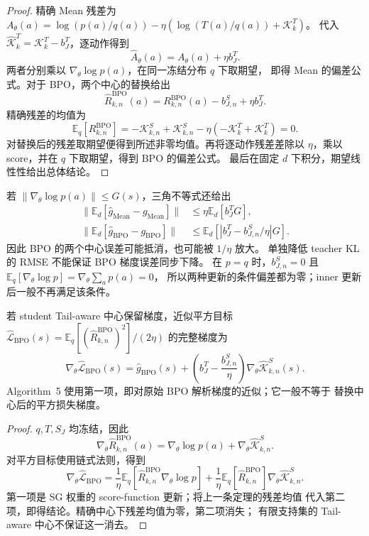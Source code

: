 \begin{proof}
精确 Mean 残差为
$A_\theta(a)=\log(p(a)/q(a))-\eta(\log(T(a)/q(a))+\mathcal K_k^T)$。
代入 $\widehat{\mathcal K}_k^T=\mathcal K_k^T-b_J^T$，逐动作得到
\[
 \widehat A_\theta(a)=A_\theta(a)+\eta b_J^T.
\]
两者分别乘以 $\nabla_\theta\log p(a)$，在同一冻结分布 $q$ 下取期望，
即得 Mean 的偏差公式。对于 BPO，两个中心的替换给出
\[
 \widehat R_{k,n}^{\mathrm{BPO}}(a)=R_{k,n}^{\mathrm{BPO}}(a)-b_{J,n}^S+\eta b_J^T.
\]
精确残差的均值为
\[
 \mathbb E_q[R_{k,n}^{\mathrm{BPO}}]
 =-\mathcal K_{k,n}^S+\mathcal K_{k,n}^S
 -\eta(-\mathcal K_k^T+\mathcal K_k^T)=0.
\]
对替换后的残差取期望便得到所述非零均值。再将逐动作残差差除以
$\eta$，乘以 score，并在 $q$ 下取期望，得到 BPO 的偏差公式。
最后在固定 $d$ 下积分，期望线性性给出总体结论。
\end{proof}

若 $\lVert\nabla_\theta\log p(a)\rVert\le G(s)$，三角不等式还给出
\begin{align}
 \lVert\mathbb E_d[\widehat g_{\mathrm{Mean}}-g_{\mathrm{Mean}}]\rVert
 &\le\eta\mathbb E_d[b_J^T G],\\
 \lVert\mathbb E_d[\widehat g_{\mathrm{BPO}}-g_{\mathrm{BPO}}]\rVert
 &\le\mathbb E_d[|b_J^T-b_{J,n}^S/\eta|G].
\end{align}
因此 BPO 的两个中心误差可能抵消，也可能被 $1/\eta$ 放大。
单独降低 teacher KL 的 RMSE 不能保证 BPO 梯度误差同步下降。
在 $p=q$ 时，$b_{J,n}^S=0$ 且
$\mathbb E_q[\nabla_\theta\log p]=\nabla_\theta\sum_a p(a)=0$，
所以两种更新的条件偏差都为零；inner 更新后一般不再满足该条件。

\begin{proposition}
\label{prop:ch2-ta-square-versus-sg}
若 student Tail-aware 中心保留梯度，近似平方目标
 $\widehat{\mathcal L}_{\mathrm{BPO}}(s)=\mathbb E_q[(\widehat R_{k,n}^{\mathrm{BPO}})^2]/(2\eta)$
的完整梯度为
\begin{equation}
 \nabla_\theta\widehat{\mathcal L}_{\mathrm{BPO}}(s)
 =\widehat g_{\mathrm{BPO}}(s)
 +\left(b_J^T-\frac{b_{J,n}^S}{\eta}\right)
   \nabla_\theta\widehat{\mathcal K}_{k,n}^S(s).
\end{equation}
Algorithm~5 使用第一项，即对原始 BPO 解析梯度的近似；它一般不等于
替换中心后的平方损失梯度。
\end{proposition}

\begin{proof}
$q,T,S_J$ 均冻结，因此
\[
 \nabla_\theta\widehat R_{k,n}^{\mathrm{BPO}}(a)
 =\nabla_\theta\log p(a)+\nabla_\theta\widehat{\mathcal K}_{k,n}^S.
\]
对平方目标使用链式法则，得到
\[
 \nabla_\theta\widehat{\mathcal L}_{\mathrm{BPO}}
 =\frac1\eta\mathbb E_q[\widehat R_{k,n}^{\mathrm{BPO}}\nabla_\theta\log p]
 +\frac1\eta\mathbb E_q[\widehat R_{k,n}^{\mathrm{BPO}}]
   \nabla_\theta\widehat{\mathcal K}_{k,n}^S.
\]
第一项是 SG 权重的 score-function 更新；将上一条定理的残差均值
代入第二项，即得结论。精确中心下残差均值为零，第二项消失；
有限支持集的 Tail-aware 中心不保证这一消去。
\end{proof}


